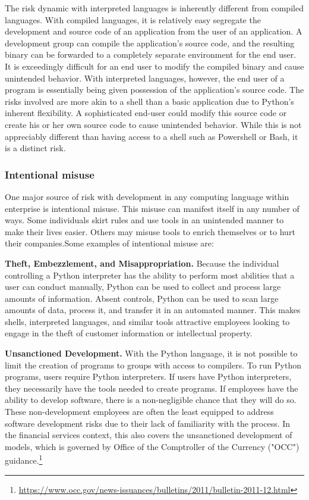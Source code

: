 		The risk dynamic with interpreted languages is inherently different from compiled languages. With compiled languages, it is relatively easy segregate the development and source code of an application from the user of an application. A development group can compile the application's source code, and the resulting binary can be forwarded to a completely separate environment for the end user. It is exceedingly difficult for an end user to modify the compiled binary and cause unintended behavior. With interpreted languages, however, the end user of a program is essentially being given possession of the application's source code. The risks involved are more akin to a shell than a basic application due to Python's inherent flexibility. A sophisticated end-user could modify this source code or create his or her own source code to cause unintended behavior. While this is not appreciably different than having access to a shell such as Powershell or Bash, it is a distinct risk.

		\subsubsection{Intentional misuse}

			One major source of risk with development in any computing language within enterprise is intentional misuse. This misuse can manifest itself in any number of ways. Some individuals skirt rules and use tools in an unintended manner to make their lives easier. Others may misuse tools to enrich themselves or to hurt their companies.Some examples of intentional misuse are:

			\textbf{Theft, Embezzlement, and Misappropriation.}
			Because the individual controlling a Python interpreter has the ability to perform most abilities that a user can conduct manually, Python can be used to collect and process large amounts of information. Absent controls, Python can be used to scan large amounts of data, process it, and transfer it in an automated manner. This makes shells, interpreted languages, and similar tools attractive employees looking to engage in the theft of customer information or intellectual property.

			\textbf{Unsanctioned Development.}
			With the Python language, it is not possible to limit the creation of programs to groups with access to compilers. To run Python programs, users require Python interpreters. If users have Python interpreters, they necessarily have the tools needed to create programs. If employees have the ability to develop software, there is a non-negligible chance that they will do so. These non-development employees are often the least equipped to address software development risks due to their lack of familiarity with the process. In the financial services context, this also covers the unsanctioned development of models, which is governed by Office of the Comptroller of the Currency ("OCC") guidance.\footnote{\url{https://www.occ.gov/news-issuances/bulletins/2011/bulletin-2011-12.html}}

